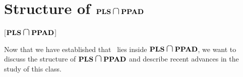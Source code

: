 \section{Structure of \texorpdfstring{$\PLS \medcap \PPAD$}{\PLS\ and \PPAD}}[\texorpdfstring{$\PLS \medcap \PPAD$}{\PLS\ and \PPAD}]

Now that we have established that \Tarski\ lies inside $\PLS \medcap \PPAD$, we want to discuss the structure of $\PLS \medcap \PPAD$ and describe recent advances in the study of this class.
